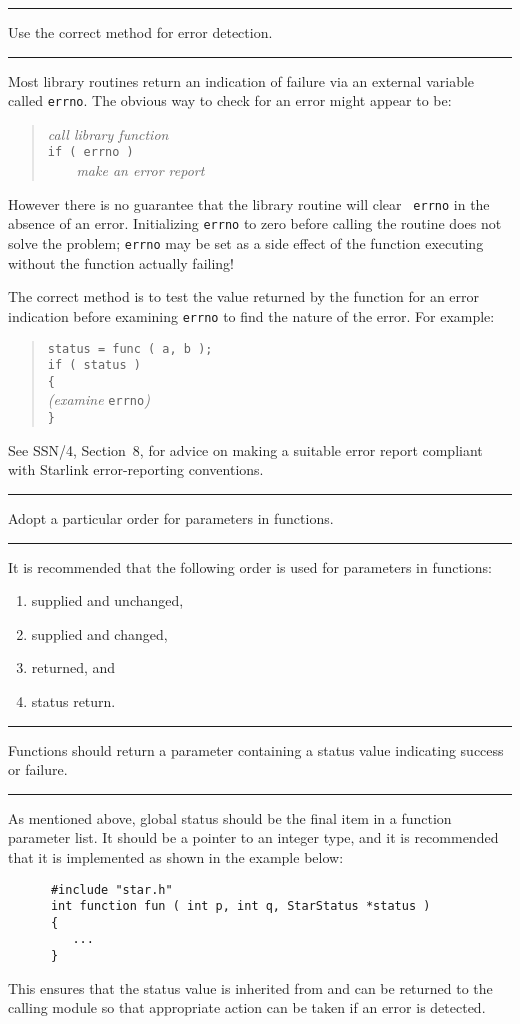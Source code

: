 \documentclass[twoside,11pt]{article}
\newcounter{sruleno}
\newcommand{\srule}[1]{
    \addtocounter{sruleno}{1}
    \goodbreak
    \rule[0.5ex]{\textwidth}{0.3mm}
    {\Large #1 \hfill {\thesruleno}}
    \rule[0.5ex]{\textwidth}{0.1mm}
}
\newcommand{\srule}[1]{
       \addtocounter{sruleno}{1}
       \begin{rawhtml} <HR> \end{rawhtml}
       {\Large \thesruleno}~~~~{\Large #1}
       \begin{rawhtml} <HR> \end{rawhtml}
       \end{tabular}
  }
\begin{document}
\srule{Use the correct method for error detection.}
Most library routines return an indication of failure via an external 
variable called {\tt errno}.
The obvious way to check for an error might appear to be:
\begin{quote}
    {\sl call library function}\\
    {\tt if ( errno )}\\
    {\sl  \ \ \ \ make an error report}
\end{quote}
However there is no guarantee that the library routine will clear {\tt 
errno} in the absence of an error. Initializing {\tt errno} to zero
before  calling the routine does not solve the problem;
{\tt errno} may be set as
a side effect of the function executing without the function actually failing!

The correct method is to test the value returned by the function
for an error indication
before examining {\tt errno} to find the nature of the error. For example:
\begin{quote}
      {\tt status = func ( a, b );}\\
      {\tt if ( status )}\\
      {\tt \{}\\
      {\sl (examine} {\tt errno}{\sl )}\\
      {\tt \}}
\end{quote}
See SSN/4, Section~8,  for advice on making a suitable error report
compliant with Starlink error-reporting conventions.


\srule{Adopt a particular order for parameters in functions.}
It is recommended that the following order is used for parameters in 
functions:
\begin{enumerate}
\item supplied and unchanged, 
\item supplied and changed, 
\item returned, and 
\item status return.
\end{enumerate}


\srule{Functions should return a parameter containing a status value 
indicating success or failure.}
As mentioned above, global status should be the final item 
in a function parameter list.
It should be a pointer to an integer type, and it is recommended that it is 
implemented as shown in the example below:
\begin{verbatim}
      #include "star.h"
      int function fun ( int p, int q, StarStatus *status )
      {      
         ...
      }
\end{verbatim}
This ensures that the status value is inherited from and can be
returned to the calling module so that appropriate action can be
taken if an error is detected.
\end{document}
